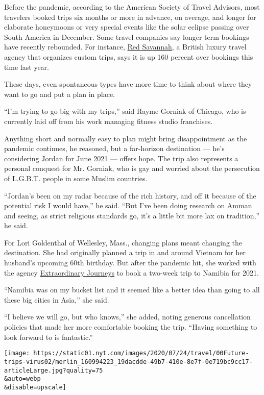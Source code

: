 Before the pandemic, according to the American Society of Travel
Advisors, most travelers booked trips six months or more in advance, on
average, and longer for elaborate honeymoons or very special events like
the solar eclipse passing over South America in December. Some travel
companies say longer term bookings have recently rebounded. For
instance, \href{https://www.redsavannah.com/}{Red Savannah}, a British
luxury travel agency that organizes custom trips, says it is up 160
percent over bookings this time last year.

These days, even spontaneous types have more time to think about where
they want to go and put a plan in place.

``I'm trying to go big with my trips,'' said Rayme Gorniak of Chicago,
who is currently laid off from his work managing fitness studio
franchises.

Anything short and normally easy to plan might bring disappointment as
the pandemic continues, he reasoned, but a far-horizon destination ---
he's considering Jordan for June 2021 --- offers hope. The trip also
represents a personal conquest for Mr. Gorniak, who is gay and worried
about the persecution of L.G.B.T. people in some Muslim countries.

``Jordan's been on my radar because of the rich history, and off it
because of the potential risk I would have,'' he said. ``But I've been
doing research on Amman and seeing, as strict religious standards go,
it's a little bit more lax on tradition,'' he said.

For Lori Goldenthal of Wellesley, Mass., changing plans meant changing
the destination. She had originally planned a trip in and around Vietnam
for her husband's upcoming 60th birthday. But after the pandemic hit,
she worked with the agency
\href{https://extraordinaryjourneys.com/}{Extraordinary Journeys} to
book a two-week trip to Namibia for 2021.

``Namibia was on my bucket list and it seemed like a better idea than
going to all these big cities in Asia,'' she said.

``I believe we will go, but who knows,'' she added, noting generous
cancellation policies that made her more comfortable booking the trip.
``Having something to look forward to is fantastic.''

\texttt{[image: https://static01.nyt.com/images/2020/07/24/travel/00Future-trips-virus02/merlin\_160994223\_19dacdde-49b7-410e-8e7f-0e719bc9cc17-articleLarge.jpg?quality=75\\\&auto=webp\\\&disable=upscale]}

